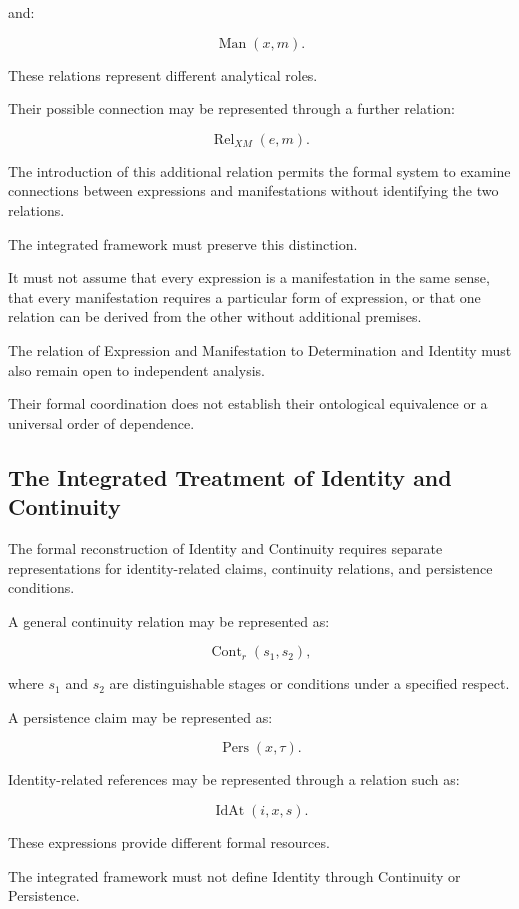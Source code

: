 and:

\[
    \operatorname{Man}(x,m).
\]

These relations represent
different analytical roles.

Their possible connection
may be represented through
a further relation:

\[
    \operatorname{Rel}_{XM}(e,m).
\]

The introduction of this
additional relation permits
the formal system to
examine connections
between expressions and
manifestations without
identifying the two
relations.

The integrated framework
must preserve this distinction.

It must not assume that
every expression is a
manifestation in the
same sense, that every
manifestation requires
a particular form of
expression, or that
one relation can be
derived from the other
without additional premises.

The relation of Expression
and Manifestation to
Determination and Identity
must also remain open
to independent analysis.

Their formal coordination
does not establish
their ontological equivalence
or a universal order
of dependence.

\subsection{The Integrated Treatment of Identity and Continuity}

The formal reconstruction
of Identity and Continuity
requires separate representations
for identity-related claims,
continuity relations, and
persistence conditions.

A general continuity relation
may be represented as:

\[
    \operatorname{Cont}_{r}(s_1,s_2),
\]

where \(s_1\) and \(s_2\)
are distinguishable stages
or conditions under
a specified respect.

A persistence claim may
be represented as:

\[
    \operatorname{Pers}(x,\tau).
\]

Identity-related references
may be represented through
a relation such as:

\[
    \operatorname{IdAt}(i,x,s).
\]

These expressions provide
different formal resources.

The integrated framework
must not define Identity
through Continuity or
Persistence.

